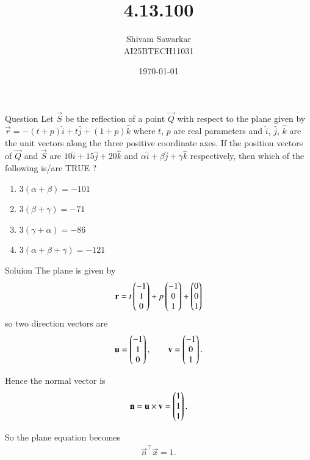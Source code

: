 \documentclass{beamer}
\title %
{4.13.100}
\date{\today}
\author %
{Shivam Sawarkar \\ AI25BTECH11031}
\begin{document}
\frame{\titlepage}
\begin{frame}{Question}
    Let $\vec{S}$ be the reflection of a point $\vec{Q}$ with respect to the plane given by $\vec{r}=-(t+p)\hat{i}+t\hat{j}+(1+p)\hat{k}$ where $t$, $p$ are real parameters and $\hat{i}$, $\hat{j}$, $\hat{k}$ are the unit vectors along the three positive coordinate axes. If the position vectors of $\vec{Q}$ and $\vec{S}$ are $10\hat{i}+15\hat{j}+20\hat{k}$ and $\alpha\hat{i}+\beta\hat{j}+\gamma\hat{k}$ respectively, then which of the following is/are TRUE ? \\ 
\begin{enumerate}[a]
    \item $3(\alpha+\beta) = -101$
    \item $3(\beta+\gamma) = -71$
    \item $3(\gamma+\alpha) = -86$
    \item $3(\alpha+\beta+\gamma) = -121$
\end{enumerate}
\end{frame}

\begin{frame}{Soluion}
    The plane is given by 
\begin{align}
\mathbf{r} = t\begin{pmatrix}-1 \\ 1 \\ 0\end{pmatrix}+p\begin{pmatrix}-1 \\ 0 \\ 1\end{pmatrix}+\begin{pmatrix}0 \\ 0 \\ 1\end{pmatrix}
\end{align} 
so two direction vectors are
\begin{align}
\mathbf{u} = \begin{pmatrix}-1\\1\\0\end{pmatrix}, 
\qquad 
\mathbf{v} = \begin{pmatrix}-1\\0\\1\end{pmatrix}.
\end{align}

Hence the normal vector is
\begin{align}
\mathbf{n} = \mathbf{u} \times \mathbf{v} 
= \begin{pmatrix}1\\1\\1\end{pmatrix}.
\end{align}


So the plane equation becomes
\begin{align}
\vec{n}^\top\vec x = 1.
\end{align}
\end{frame}
\end{document}
